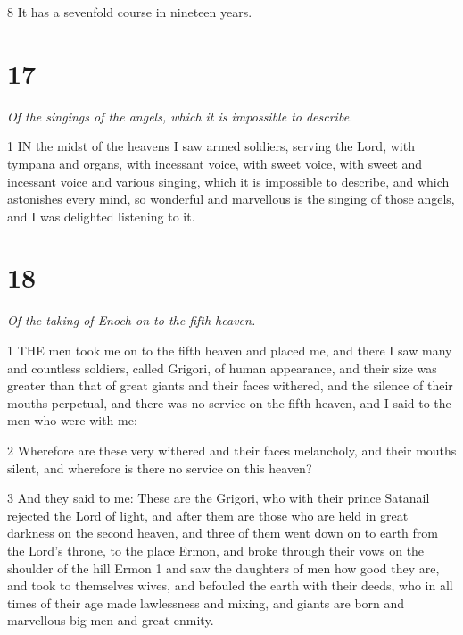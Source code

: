 \par 8 It has a sevenfold course in nineteen years.

\chapter{17}

\par \textit{Of the singings of the angels, which it is impossible to describe.}

\par 1 IN the midst of the heavens I saw armed soldiers, serving the Lord, with tympana and organs, with incessant voice, with sweet voice, with sweet and incessant voice and various singing, which it is impossible to describe, and which astonishes every mind, so wonderful and marvellous is the singing of those angels, and I was delighted listening to it.

\chapter{18}

\par \textit{Of the taking of Enoch on to the fifth heaven.}

\par 1 THE men took me on to the fifth heaven and placed me, and there I saw many and countless soldiers, called Grigori, of human appearance, and their size was greater than that of great giants and their faces withered, and the silence of their mouths perpetual, and there was no service on the fifth heaven, and I said to the men who were with me:

\par 2 Wherefore are these very withered and their faces melancholy, and their mouths silent, and wherefore is there no service on this heaven?

\par 3 And they said to me: These are the Grigori, who with their prince Satanail rejected the Lord of light, and after them are those who are held in great darkness on the second heaven, and three of them went down on to earth from the Lord's throne, to the place Ermon, and broke through their vows on the shoulder of the hill Ermon 1 and saw the daughters of men how good they are, and took to themselves wives, and befouled the earth with their deeds, who in all times of their age made lawlessness and mixing, and giants are born and marvellous big men and great enmity.

